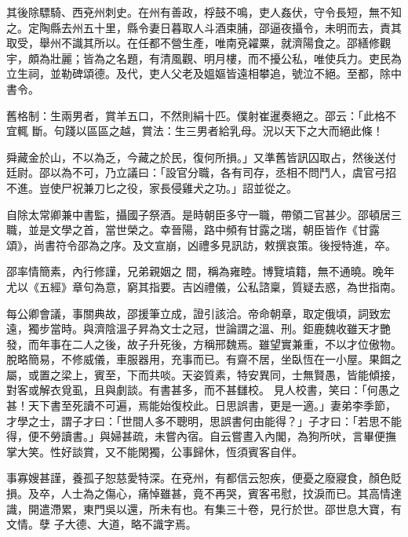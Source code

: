 \begin{pinyinscope}
 其後除驃騎、西兗州刺史。在州有善政，桴鼓不鳴，吏人姦伏，守令長短，無不知之。定陶縣去州五十里，縣令妻日暮取人斗酒束脯，邵逼夜攝令，未明而去，責其取受，舉州不識其所以。在任都不營生產，唯南兗糴粟，就濟陽食之。邵繕修觀宇，頗為壯麗；皆為之名題，有清風觀、明月樓，而不擾公私，唯使兵力。吏民為立生祠，並勒碑頌德。及代，吏人父老及媼嫗皆遠相攀追，號泣不絕。至都，除中書令。



 舊格制：生兩男者，賞羊五口，不然則絹十匹。僕射崔暹奏絕之。邵云：「此格不宜輒
 斷。句踐以區區之越，賞法：生三男者給乳母。況以天下之大而絕此條！



 舜藏金於山，不以為乏，今藏之於民，復何所損。」又準舊皆訊囚取占，然後送付廷尉。邵以為不可，乃立議曰：「設官分職，各有司存，丞相不問鬥人，虞官弓招不進。豈使尸祝兼刀匕之役，家長侵雞犬之功。」詔並從之。



 自除太常卿兼中書監，攝國子祭酒。是時朝臣多守一職，帶領二官甚少。邵頓居三職，並是文學之首，當世榮之。幸晉陽，路中頻有甘露之瑞，朝臣皆作《甘露頌》，尚書符令邵為之序。及文宣崩，凶禮多見訊訪，敕撰哀策。後授特進，卒。



 邵率情簡素，內行修謹，兄弟親姻之
 間，稱為雍睦。博覽墳籍，無不通曉。晚年尤以《五經》章句為意，窮其指要。吉凶禮儀，公私諮稟，質疑去惑，為世指南。



 每公卿會議，事關典故，邵援筆立成，證引該洽。帝命朝章，取定俄頃，詞致宏遠，獨步當時。與濟陰溫子昇為文士之冠，世論謂之溫、刑。鉅鹿魏收雖天才艷發，而年事在二人之後，故子升死後，方稱邢魏焉。雖望實兼重，不以才位傲物。脫略簡易，不修威儀，車服器用，充事而已。有齋不居，坐臥恆在一小屋。果餌之屬，或置之梁上，賓至，下而共啖。天姿質素，特安異同，士無賢愚，皆能傾接，對客或解衣覓虱，且與劇談。有書甚多，而不甚讎校。
 見人校書，笑曰：「何愚之甚！天下書至死讀不可遍，焉能始復校此。日思誤書，更是一適。」妻弟李季節，才學之士，謂子才曰：「世間人多不聰明，思誤書何由能得？」子才曰：「若思不能得，便不勞讀書。」與婦甚疏，未嘗內宿。自云嘗晝入內閣，為狗所吠，言畢便撫掌大笑。性好談賞，又不能閑獨，公事歸休，恆須賓客自伴。



 事寡嫂甚謹，養孤子恕慈愛特深。在兗州，有都信云恕疾，便憂之廢寢食，顏色貶損。及卒，人士為之傷心，痛悼雖甚，竟不再哭，賓客弔慰，抆淚而已。其高情達識，開遣滯累，東門吳以還，所未有也。有集三十卷，見行於世。邵世息大寶，有文情。孽
 子大德、大道，略不識字焉。




\end{pinyinscope}
